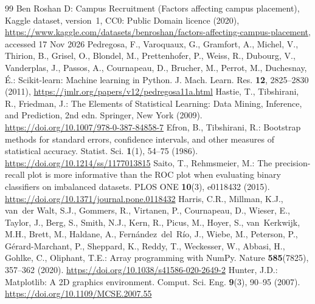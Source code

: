 \documentclass[runningheads]{llncs}
\providecommand{\doi}[1]{\url{https://doi.org/#1}}
\begin{document}
\begin{thebibliography}{99}
 Ben Roshan D: Campus Recruitment (Factors affecting campus placement), Kaggle dataset, version~1, CC0: Public Domain licence (2020), \url{https://www.kaggle.com/datasets/benroshan/factors-affecting-campus-placement}, accessed 17 Nov 2026
 Pedregosa, F., Varoquaux, G., Gramfort, A., Michel, V., Thirion, B., Grisel, O., Blondel, M., Prettenhofer, P., Weiss, R., Dubourg, V., Vanderplas, J., Passos, A., Cournapeau, D., Brucher, M., Perrot, M., Duchesnay, {\'E}.: Scikit-learn: Machine learning in Python. J. Mach. Learn. Res. \textbf{12}, 2825--2830 (2011), \url{https://jmlr.org/papers/v12/pedregosa11a.html}
 Hastie, T., Tibshirani, R., Friedman, J.: The Elements of Statistical Learning: Data Mining, Inference, and Prediction, 2nd edn. Springer, New York (2009). \doi{10.1007/978-0-387-84858-7}
 Efron, B., Tibshirani, R.: Bootstrap methods for standard errors, confidence intervals, and other measures of statistical accuracy. Statist. Sci. \textbf{1}(1), 54--75 (1986). \doi{10.1214/ss/1177013815}
 Saito, T., Rehmsmeier, M.: The precision-recall plot is more informative than the ROC plot when evaluating binary classifiers on imbalanced datasets. PLOS ONE \textbf{10}(3), e0118432 (2015). \doi{10.1371/journal.pone.0118432}
 Harris, C.R., Millman, K.J., van~der Walt, S.J., Gommers, R., Virtanen, P., Cournapeau, D., Wieser, E., Taylor, J., Berg, S., Smith, N.J., Kern, R., Picus, M., Hoyer, S., van~Kerkwijk, M.H., Brett, M., Haldane, A., Fern{\'a}ndez~del~R{\'i}o, J., Wiebe, M., Peterson, P., G{\'e}rard-Marchant, P., Sheppard, K., Reddy, T., Weckesser, W., Abbasi, H., Gohlke, C., Oliphant, T.E.: Array programming with NumPy. Nature \textbf{585}(7825), 357--362 (2020). \doi{10.1038/s41586-020-2649-2}
 Hunter, J.D.: Matplotlib: A 2D graphics environment. Comput. Sci. Eng. \textbf{9}(3), 90--95 (2007). \doi{10.1109/MCSE.2007.55}
\end{thebibliography}
\end{document}
